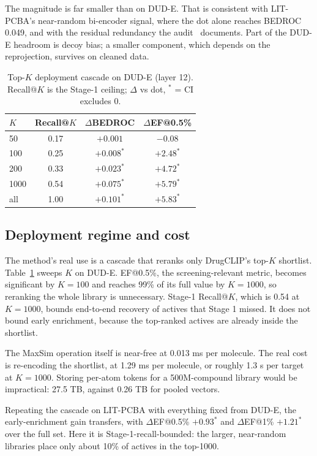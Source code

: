 \documentclass[10pt,letterpaper,twocolumn]{article}
\begin{document}
The magnitude is far smaller than on DUD-E. That is consistent with LIT-PCBA's near-random bi-encoder signal, where the dot alone reaches BEDROC 0.049, and with the residual redundancy the audit~\cite{litpcbaaudit} documents. Part of the DUD-E headroom is decoy bias; a smaller component, which depends on the reprojection, survives on cleaned data.

\begin{table}[t]
\centering
\small
\caption{Top-$K$ deployment cascade on DUD-E (layer 12). Recall@$K$ is the Stage-1 ceiling; $\Delta$ vs dot, $^{*}$ = CI excludes 0.}
\label{tab:cascade}
\begin{tabular}{@{}lccc@{}}
\toprule
$K$ & Recall@$K$ & $\Delta$BEDROC & $\Delta$EF@0.5\% \\
\midrule
50 & 0.17 & $+0.001$ & $-0.08$ \\
100 & 0.25 & $+0.008^{*}$ & $+2.48^{*}$ \\
200 & 0.33 & $+0.023^{*}$ & $+4.72^{*}$ \\
1000 & 0.54 & $+0.075^{*}$ & $+5.79^{*}$ \\
all & 1.00 & $+0.101^{*}$ & $+5.83^{*}$ \\
\bottomrule
\end{tabular}
\end{table}

\subsection{Deployment regime and cost}
\label{sec:cost}

The method's real use is a cascade that reranks only DrugCLIP's top-$K$ shortlist. Table~\ref{tab:cascade} sweeps $K$ on DUD-E. EF@0.5\%, the screening-relevant metric, becomes significant by $K = 100$ and reaches 99\% of its full value by $K = 1000$, so reranking the whole library is unnecessary. Stage-1 Recall@$K$, which is 0.54 at $K = 1000$, bounds end-to-end recovery of actives that Stage 1 missed. It does not bound early enrichment, because the top-ranked actives are already inside the shortlist.

The MaxSim operation itself is near-free at 0.013 ms per molecule. The real cost is re-encoding the shortlist, at 1.29 ms per molecule, or roughly 1.3 s per target at $K = 1000$. Storing per-atom tokens for a 500M-compound library would be impractical: 27.5 TB, against 0.26 TB for pooled vectors.

Repeating the cascade on LIT-PCBA with everything fixed from DUD-E, the early-enrichment gain transfers, with $\Delta$EF@0.5\% $+0.93^{*}$ and $\Delta$EF@1\% $+1.21^{*}$ over the full set. Here it is Stage-1-recall-bounded: the larger, near-random libraries place only about 10\% of actives in the top-1000.
\end{document}
